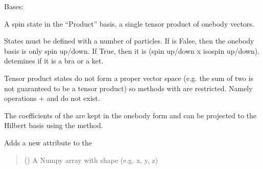 \documentclass[letterpaper,10pt,english]{sphinxmanual}
\begin{document}

\begin{fulllineitems}
\label{\detokenize{spinbox:spinbox.core.ProductState}}
\pysigstartsignatures
{}
\pysigstopsignatures
\sphinxAtStartPar
Bases: 

\sphinxAtStartPar
A spin state in the “Product” basis, a single tensor product of one\sphinxhyphen{}body vectors.

\sphinxAtStartPar
States must be defined with a number of particles. 
If  is False, then the one\sphinxhyphen{}body basis is only spin up/down. If True, then it is (spin up/down x isospin up/down).
 detemines if it is a bra or a ket.

\sphinxAtStartPar
Tensor product states do not form a proper vector space (e.g. the sum of two is not guaranteed to be a tensor product)
so methods with  are restricted. Namely operations + and \sphinxhyphen{} do not exist.

\sphinxAtStartPar
The coefficients of the  are kept in the one\sphinxhyphen{}body form and can be projected to the Hilbert basis using the  method.

\begin{fulllineitems}
\label{\detokenize{spinbox:spinbox.core.ProductState.attach_coordinates}}
\pysigstartsignatures
{}
\pysigstopsignatures
\sphinxAtStartPar
Adds a new  attribute to the 
\begin{quote}\begin{description}
\sphinxAtStartPar
{} () \textendash{} A Numpy array with shape  (e.g. x, y, z)


\end{description}
\end{quote}
\end{fulllineitems}
\end{fulllineitems}
\end{document}
